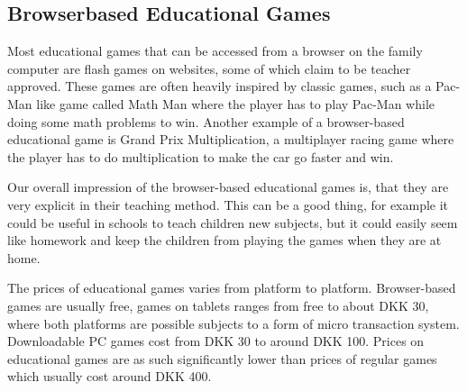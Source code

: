 \subsection{Browserbased Educational Games}
Most educational games that can be accessed from a browser on the family computer are flash games on websites, some of which claim to be teacher approved. These games are often heavily inspired by classic games, such as a Pac-Man like game called Math Man where the player has to play Pac-Man while doing some math problems to win.\cite{mathman} Another example of a browser-based educational game is Grand Prix Multiplication, a multiplayer racing game where the player has to do multiplication to make the car go faster and win.\cite{grandprix}

Our overall impression of the browser-based educational games is, that they are very explicit in their teaching method. This can be a good thing, for example it could be useful in schools to teach children new subjects, but it could easily seem like homework and keep the children from playing the games when they are at home.

The prices of educational games varies from platform to platform. Browser-based games are usually free, games on tablets ranges from free to about DKK 30, where both platforms are possible subjects to a form of micro transaction system. Downloadable PC games cost from DKK 30 to around DKK 100. Prices on educational games are as such significantly lower than prices of regular games which usually cost around DKK 400.